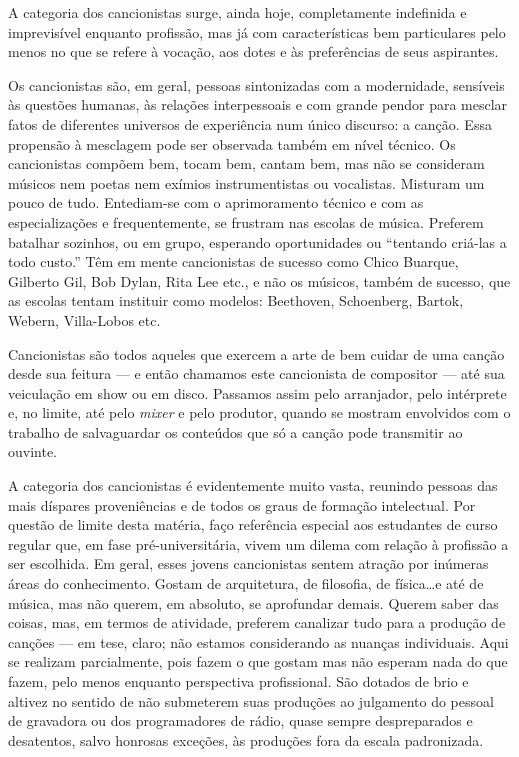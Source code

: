A categoria dos cancionistas surge, ainda hoje, completamente indefinida
e imprevisível enquanto profissão, mas já com características bem
particulares pelo menos no que se refere à vocação, aos dotes e às
preferências de seus aspirantes.

Os cancionistas são, em geral, pessoas sintonizadas com a modernidade,
sensíveis às questões humanas, às relações interpessoais e com grande
pendor para mesclar fatos de diferentes universos de experiência num
único discurso: a canção. Essa propensão à mesclagem pode ser observada
também em nível técnico. Os cancionistas compõem bem, tocam bem, cantam
bem, mas não se consideram músicos nem poetas nem exímios
instrumentistas ou vocalistas. Misturam um pouco de tudo. Entediam-se
com o aprimoramento técnico e com as especializações e frequentemente,
se frustram nas escolas de música. Preferem batalhar sozinhos, ou em
grupo, esperando oportunidades ou ``tentando criá-las a todo custo.'' Têm
em mente cancionistas de sucesso como Chico Buarque, Gilberto Gil, Bob
Dylan, Rita Lee etc., e não os músicos, também de sucesso, que as
escolas tentam instituir como modelos: Beethoven, Schoenberg, Bartok,
Webern, Villa-Lobos etc.

Cancionistas são todos aqueles que exercem a arte de bem cuidar de uma
canção desde sua feitura --- e então chamamos este cancionista de compositor ---
até sua veiculação em show ou em disco. Passamos assim pelo arranjador,
pelo intérprete e, no limite, até pelo \textit{mixer} e pelo produtor, quando
se mostram envolvidos com o trabalho de salvaguardar os conteúdos que só
a canção pode transmitir ao ouvinte.

A categoria dos cancionistas é evidentemente muito vasta, reunindo
pessoas das mais díspares proveniências e de todos os graus de formação
intelectual. Por questão de limite desta matéria, faço referência
especial aos estudantes de curso regular que, em fase pré-universitária,
vivem um dilema com relação à profissão a ser escolhida. Em geral, esses
jovens cancionistas sentem atração por inúmeras áreas do conhecimento.
Gostam de arquitetura, de filosofia, de física\ldots e até de música, mas
não querem, em absoluto, se aprofundar demais. Querem saber das coisas,
mas, em termos de atividade, preferem canalizar tudo para a produção de
canções --- em tese, claro; não estamos considerando as nuanças
individuais. Aqui se realizam parcialmente, pois fazem o que gostam mas
não esperam nada do que fazem, pelo menos enquanto perspectiva
profissional. São dotados de brio e altivez no sentido de não submeterem
suas produções ao julgamento do pessoal de gravadora ou dos
programadores de rádio, quase sempre despreparados e desatentos, salvo honrosas exceções, às
produções fora da escala padronizada.

